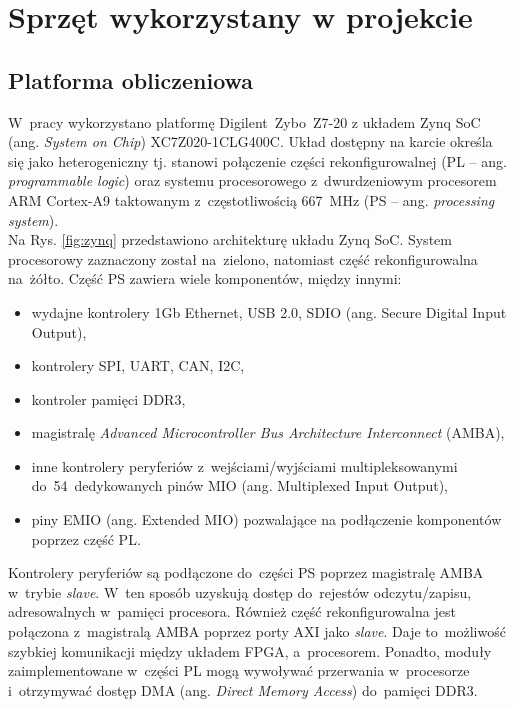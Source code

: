 \chapter{Sprzęt wykorzystany w projekcie}
\label{cha:Zybo_PCAM_dron}
\section{Platforma obliczeniowa}
\label{sec:platforma_obliczeniowa}
W~pracy wykorzystano platformę Digilent~Zybo~Z7-20 z układem Zynq SoC (ang. \textit{System on Chip}) XC7Z020-1CLG400C. %
Układ dostępny na karcie określa się jako heterogeniczny tj. stanowi połączenie części rekonfigurowalnej (PL -- ang. \textit{programmable logic}) oraz systemu procesorowego z~dwurdzeniowym procesorem ARM Cortex-A9 taktowanym z~częstotliwością 667~MHz (PS -- ang. \textit{processing system}).\\
Na Rys. \ref{fig:zynq} przedstawiono architekturę układu Zynq SoC. System procesorowy zaznaczony został na~zielono, natomiast część rekonfigurowalna na~żółto. Część PS zawiera wiele komponentów, między innymi:
\begin{itemize}
	\item wydajne kontrolery 1Gb Ethernet, USB 2.0, SDIO (ang. Secure Digital Input Output),
	\item kontrolery SPI, UART, CAN, I2C,
	\item kontroler pamięci DDR3,
	\item magistralę \textit{Advanced Microcontroller Bus Architecture Interconnect} (AMBA),
	\item inne kontrolery peryferiów z~wejściami/wyjściami multipleksowanymi do~54~dedykowanych pinów MIO (ang. Multiplexed Input Output),
	\item piny EMIO (ang. Extended MIO) pozwalające na podłączenie komponentów poprzez część PL.
\end{itemize}
Kontrolery peryferiów są podłączone do~części PS poprzez magistralę AMBA w~trybie \textit{slave}. W~ten sposób uzyskują dostęp do~rejestów odczytu/zapisu, adresowalnych w~pamięci procesora. Również część rekonfigurowalna jest połączona z~magistralą AMBA poprzez porty AXI jako \textit{slave}. Daje to~możliwość szybkiej komunikacji między układem FPGA, a~procesorem. Ponadto, moduły zaimplementowane w~części PL mogą wywoływać przerwania w~procesorze i~otrzymywać dostęp DMA (ang. \textit{Direct Memory Access}) do~pamięci DDR3.\par
